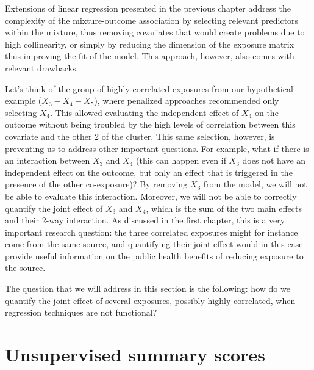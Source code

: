 \documentclass[
]{book}
\begin{document}
Extensions of linear regression presented in the previous chapter address the complexity of the mixture-outcome association by selecting relevant predictors within the mixture, thus removing covariates that would create problems due to high collinearity, or simply by reducing the dimension of the exposure matrix thus improving the fit of the model. This approach, however, also comes with relevant drawbacks.

Let's think of the group of highly correlated exposures from our hypothetical example (\(X_3-X_4-X_5\)), where penalized approaches recommended only selecting \(X_4\). This allowed evaluating the independent effect of \(X_4\) on the outcome without being troubled by the high levels of correlation between this covariate and the other 2 of the cluster. This same selection, however, is preventing us to address other important questions. For example, what if there is an interaction between \(X_3\) and \(X_4\) (this can happen even if \(X_3\) does not have an independent effect on the outcome, but only an effect that is triggered in the presence of the other co-exposure)? By removing \(X_3\) from the model, we will not be able to evaluate this interaction. Moreover, we will not be able to correctly quantify the joint effect of \(X_3\) and \(X_4\), which is the sum of the two main effects and their 2-way interaction. As discussed in the first chapter, this is a very important research question: the three correlated exposures might for instance come from the same source, and quantifying their joint effect would in this case provide useful information on the public health benefits of reducing exposure to the source.

The question that we will address in this section is the following: how do we quantify the joint effect of several exposures, possibly highly correlated, when regression techniques are not functional?

\hypertarget{unsupervised-summary-scores}{%
\section{Unsupervised summary scores}\label{unsupervised-summary-scores}}
\end{document}
